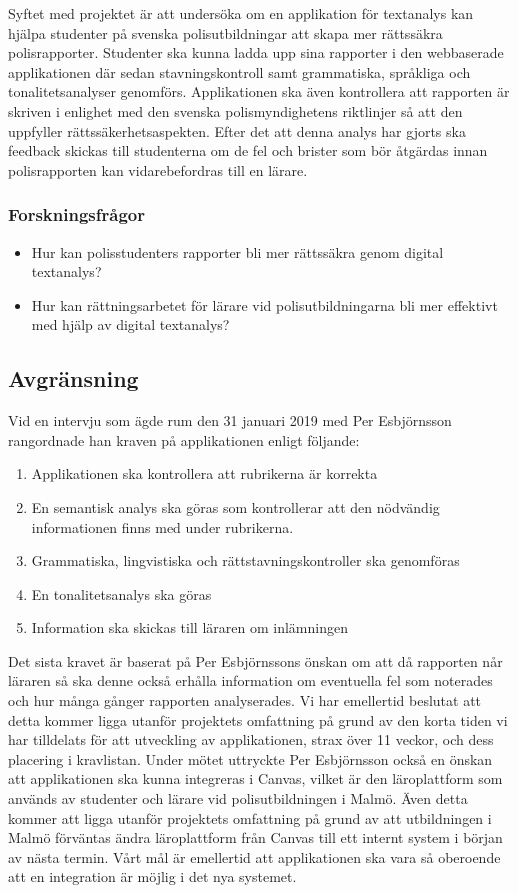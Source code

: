 \documentclass[swedish]{maucsthesis}
\begin{document}
Syftet med projektet är att undersöka om en applikation för textanalys kan
hjälpa studenter på svenska polisutbildningar att skapa mer rättssäkra
polisrapporter. Studenter ska kunna ladda upp sina rapporter i den webbaserade
applikationen där sedan stavningskontroll samt grammatiska, språkliga och
tonalitetsanalyser genomförs. Applikationen ska även kontrollera att rapporten
är skriven i enlighet med den svenska polismyndighetens riktlinjer så att den
uppfyller rättssäkerhetsaspekten. Efter det att denna analys har gjorts ska
feedback skickas till studenterna om de fel och brister som bör åtgärdas innan
polisrapporten kan vidarebefordras till en lärare.

\subsubsection{Forskningsfrågor}

\begin{itemize}
\item Hur kan polisstudenters rapporter bli mer rättssäkra genom digital
  textanalys?
\item Hur kan rättningsarbetet för lärare vid polisutbildningarna bli mer
  effektivt med hjälp av digital textanalys?
\end{itemize}

\subsection{Avgränsning}

Vid en intervju som ägde rum den 31 januari 2019 med Per Esbjörnsson rangordnade
han kraven på applikationen enligt följande:

\begin{enumerate}
\item Applikationen ska kontrollera att rubrikerna är korrekta
\item En semantisk analys ska göras som kontrollerar att den nödvändig
  informationen finns med under rubrikerna.
\item Grammatiska, lingvistiska och rättstavningskontroller ska genomföras
\item En tonalitetsanalys ska göras
\item Information ska skickas till läraren om inlämningen    
\end{enumerate}
Det sista kravet är baserat på Per Esbjörnssons önskan om att då rapporten når
läraren så ska denne också erhålla information om eventuella fel som noterades
och hur många gånger rapporten analyserades. Vi har emellertid beslutat att
detta kommer ligga utanför projektets omfattning på grund av den korta tiden vi
har tilldelats för att utveckling av applikationen, strax över 11 veckor, och
dess placering i kravlistan. Under mötet uttryckte Per Esbjörnsson också en
önskan att applikationen ska kunna integreras i Canvas, vilket är den
läroplattform som används av studenter och lärare vid polisutbildningen i Malmö.
Även detta kommer att ligga utanför projektets omfattning på grund av att
utbildningen i Malmö förväntas ändra läroplattform från Canvas till ett internt
system i början av nästa termin. Vårt mål är emellertid att applikationen ska
vara så oberoende att en integration är möjlig i det nya systemet.
\end{document}
